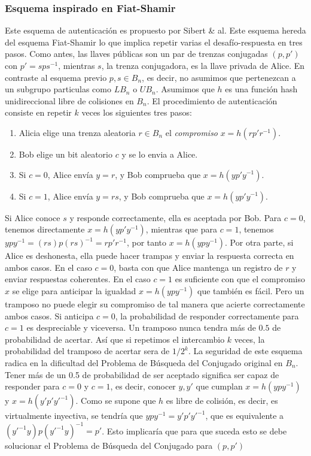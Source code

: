 \documentclass[12pt]{article}
\theoremstyle{definition}
\begin{document}
\subsubsection{Esquema inspirado en Fiat-Shamir} Este esquema de autenticación es propuesto por Sibert \& al. Este esquema hereda del esquema Fiat-Shamir lo que implica repetir varias el desafío-respuesta en tres pasos. Como antes, las llaves públicas son un par de trenzas conjugadas $(p,p')$ con $p'=sps^{-1}$, mientras $s$, la trenza conjugadora, es la llave privada de Alice. En contraste al esquema previo $p,s\in B_n$, es decir, no asumimos que pertenezcan a un subgrupo particulas como $LB_n$ o $UB_n$. Asumimos que $h$ es una función hash unidireccional libre de colisiones en $B_n$. El procedimiento de autenticación consiste en repetir $k$ veces los siguientes tres pasos:

\begin{enumerate}
\item Alicia elige una trenza aleatoria $r\in B_n$ el \textit{compromiso} $x=h(rp'r^{-1})$.
\item Bob elige un bit aleatorio $c$ y se lo envia a Alice.
\item Si $c=0$, Alice envía $y=r$, y Bob comprueba que $x=h(yp'y^{-1})$.
\item Si $c=1$, Alice envía $y=rs$, y Bob comprueba que $x=h(yp'y^{-1})$.
\end{enumerate}

Si Alice conoce $s$ y responde correctamente, ella es aceptada por Bob. Para $c=0$, tenemos directamente $x=h(yp'y^{-1})$, mientras que para $c=1$, tenemos $ypy^{-1}=(rs)p(rs)^{-1}=rp'r^{-1}$, por tanto $x=h(ypy^{-1})$. Por otra parte, si Alice es deshonesta, ella puede hacer trampas y enviar la respuesta correcta en ambos casos. En el caso $c=0$, basta con que Alice mantenga un registro de $r$ y enviar respuestas coherentes. En el caso $c=1$ es suficiente con que el compromiso $x$ se elige para anticipar la igualdad $x=h(ypy^{-1})$ que también es fácil. Pero un tramposo no puede elegir su compromiso de tal manera que acierte correctamente ambos casos. Si anticipa $c=0$, la probabilidad de responder correctamente para $c=1$ es despreciable y viceversa. Un tramposo nunca tendra más de $0.5$ de probabilidad de acertar. Así que si repetimos el intercambio $k$ veces, la probabilidad del tramposo de acertar sera de $1/2^k$.
\newline
\newline
La seguridad de este esquema radica en la dificultad del Problema de Búsqueda del Conjugado original en $B_n$. Tener más de un 0.5 de probabilidad de ser aceptado significa ser capaz de responder para $c=0$ y $c=1$, es decir, conocer $y,y'$ que cumplan $x=h(ypy^{-1})$ y $x=h(y'p'y'^{-1})$. Como se supone que $h$ es libre de colisión, es decir, es virtualmente inyectiva, se tendría que $ypy^{-1}=y'p'y'^{-1}$, que es equivalente a $(y'^{-1}y)p(y'^{-1}y)^{-1}=p'$. Esto implicaría que para que suceda esto se debe solucionar el Problema de Búsqueda del Conjugado para $(p,p')$
\end{document}
